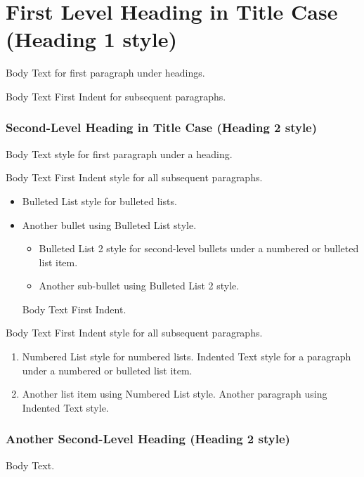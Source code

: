 
\part{First Level Heading in Title Case (Heading 1 style)}
Body Text for first paragraph under headings.

Body Text First Indent for subsequent paragraphs.

\section{Second-Level Heading in Title Case (Heading 2 style)}

Body Text style for first paragraph under a heading.

Body Text First Indent style for all subsequent paragraphs.

\begin{itemize}
    \item Bulleted List style for bulleted lists.
    \item Another bullet using Bulleted List style.
    \begin{itemize}
        \item Bulleted List 2 style for second-level bullets under a numbered or bulleted list item.
        \item Another sub-bullet using Bulleted List 2 style.
    \end{itemize}
    Body Text First Indent. 
\end{itemize}

Body Text First Indent style for all subsequent paragraphs.

\begin{enumerate}
    \item Numbered List style for numbered lists.
    Indented Text style for a paragraph under a numbered or bulleted list item. 
    \item Another list item using Numbered List style.
    Another paragraph using Indented Text style.
\end{enumerate}

\section{Another Second-Level Heading (Heading 2 style)}
Body Text.


